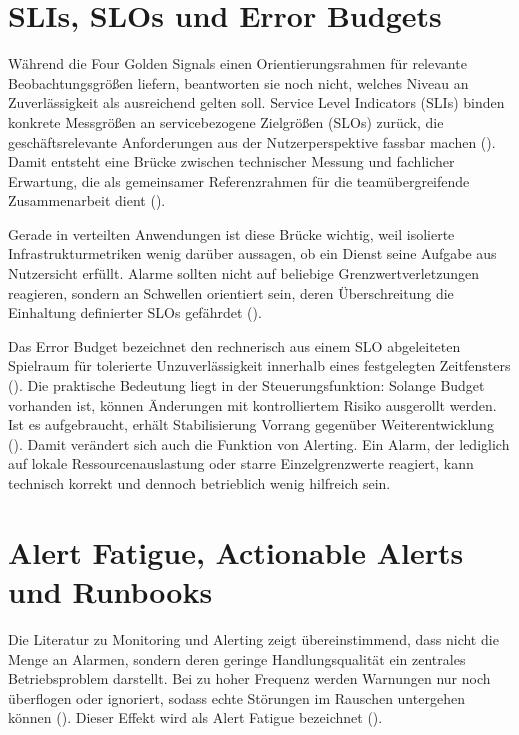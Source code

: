  
\section{SLIs, SLOs und Error Budgets}
 
Während die Four Golden Signals einen Orientierungsrahmen für relevante Beobachtungsgrößen liefern, beantworten sie noch nicht, welches Niveau an Zuverlässigkeit als ausreichend gelten soll. Service Level Indicators (SLIs) binden konkrete Messgrößen an servicebezogene Zielgrößen (SLOs) zurück, die geschäftsrelevante Anforderungen aus der Nutzerperspektive fassbar machen (\cite[S.~11]{Niedermaier2019onObservability}). Damit entsteht eine Brücke zwischen technischer Messung und fachlicher Erwartung, die als gemeinsamer Referenzrahmen für die teamübergreifende Zusammenarbeit dient (\cite[S.~12]{Niedermaier2019onObservability}).
 
Gerade in verteilten Anwendungen ist diese Brücke wichtig, weil isolierte Infrastrukturmetriken wenig darüber aussagen, ob ein Dienst seine Aufgabe aus Nutzersicht erfüllt. Alarme sollten nicht auf beliebige Grenzwertverletzungen reagieren, sondern an Schwellen orientiert sein, deren Überschreitung die Einhaltung definierter SLOs gefährdet (\cite[S.~176]{vinnakota2025creating}).
 
Das Error Budget bezeichnet den rechnerisch aus einem SLO abgeleiteten Spielraum für tolerierte Unzuverlässigkeit innerhalb eines festgelegten Zeitfensters (\cite[S.~993]{dasari2025errorBudgetManagement}). Die praktische Bedeutung liegt in der Steuerungsfunktion: Solange Budget vorhanden ist, können Änderungen mit kontrolliertem Risiko ausgerollt werden. Ist es aufgebraucht, erhält Stabilisierung Vorrang gegenüber Weiterentwicklung (\cite[S.~993--994]{dasari2025errorBudgetManagement}). Damit verändert sich auch die Funktion von Alerting. Ein Alarm, der lediglich auf lokale Ressourcenauslastung oder starre Einzelgrenzwerte reagiert, kann technisch korrekt und dennoch betrieblich wenig hilfreich sein.
 
 
\section{Alert Fatigue, Actionable Alerts und Runbooks}
 
Die Literatur zu Monitoring und Alerting zeigt übereinstimmend, dass nicht die Menge an Alarmen, sondern deren geringe Handlungsqualität ein zentrales Betriebsproblem darstellt. Bei zu hoher Frequenz werden Warnungen nur noch überflogen oder ignoriert, sodass echte Störungen im Rauschen untergehen können (\cite[S.~57]{ewaschukMonitoringDistributedSystems}). Dieser Effekt wird als Alert Fatigue bezeichnet (\cite[S.~173]{vinnakota2025creating}).
 
